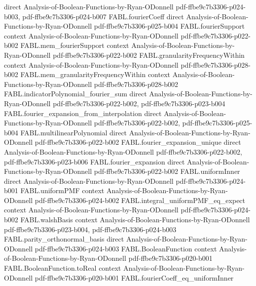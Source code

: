 \begin{theorem}
  {direct}
  {Analysis-of-Boolean-Functions-by-Ryan-ODonnell}
  {pdf-ffbe9c7b3306-p024-b003,
    pdf-ffbe9c7b3306-p024-b007}
\proofstep
  {FABL.fourierCoeff}
  {direct}
  {Analysis-of-Boolean-Functions-by-Ryan-ODonnell}
  {pdf-ffbe9c7b3306-p025-b004}
\proofstep
  {FABL.fourierSupport}
  {context}
  {Analysis-of-Boolean-Functions-by-Ryan-ODonnell}
  {pdf-ffbe9c7b3306-p022-b002}
\proofstep
  {FABL.mem_fourierSupport}
  {context}
  {Analysis-of-Boolean-Functions-by-Ryan-ODonnell}
  {pdf-ffbe9c7b3306-p022-b002}
\proofstep
  {FABL.granularityFrequencyWithin}
  {context}
  {Analysis-of-Boolean-Functions-by-Ryan-ODonnell}
  {pdf-ffbe9c7b3306-p028-b002}
\proofstep
  {FABL.mem_granularityFrequencyWithin}
  {context}
  {Analysis-of-Boolean-Functions-by-Ryan-ODonnell}
  {pdf-ffbe9c7b3306-p028-b002}
\proofstep
  {FABL.indicatorPolynomial_fourier_sum}
  {direct}
  {Analysis-of-Boolean-Functions-by-Ryan-ODonnell}
  {pdf-ffbe9c7b3306-p022-b002,
    pdf-ffbe9c7b3306-p023-b004}
\proofstep
  {FABL.fourier_expansion_from_interpolation}
  {direct}
  {Analysis-of-Boolean-Functions-by-Ryan-ODonnell}
  {pdf-ffbe9c7b3306-p022-b002,
    pdf-ffbe9c7b3306-p025-b004}
\proofstep
  {FABL.multilinearPolynomial}
  {direct}
  {Analysis-of-Boolean-Functions-by-Ryan-ODonnell}
  {pdf-ffbe9c7b3306-p022-b002}
\proofstep
  {FABL.fourier_expansion_unique}
  {direct}
  {Analysis-of-Boolean-Functions-by-Ryan-ODonnell}
  {pdf-ffbe9c7b3306-p022-b002,
    pdf-ffbe9c7b3306-p023-b006}
\proofstep
  {FABL.fourier_expansion}
  {direct}
  {Analysis-of-Boolean-Functions-by-Ryan-ODonnell}
  {pdf-ffbe9c7b3306-p022-b002}
\proofstep
  {FABL.uniformInner}
  {direct}
  {Analysis-of-Boolean-Functions-by-Ryan-ODonnell}
  {pdf-ffbe9c7b3306-p024-b001}
\proofstep
  {FABL.uniformPMF}
  {context}
  {Analysis-of-Boolean-Functions-by-Ryan-ODonnell}
  {pdf-ffbe9c7b3306-p024-b002}
\proofstep
  {FABL.integral_uniformPMF_eq_expect}
  {context}
  {Analysis-of-Boolean-Functions-by-Ryan-ODonnell}
  {pdf-ffbe9c7b3306-p024-b002}
\proofstep
  {FABL.walshBasis}
  {context}
  {Analysis-of-Boolean-Functions-by-Ryan-ODonnell}
  {pdf-ffbe9c7b3306-p023-b004,
    pdf-ffbe9c7b3306-p024-b003}
\proofstep
  {FABL.parity_orthonormal_basis}
  {direct}
  {Analysis-of-Boolean-Functions-by-Ryan-ODonnell}
  {pdf-ffbe9c7b3306-p024-b003}
\proofstep
  {FABL.BooleanFunction}
  {context}
  {Analysis-of-Boolean-Functions-by-Ryan-ODonnell}
  {pdf-ffbe9c7b3306-p020-b001}
\proofstep
  {FABL.BooleanFunction.toReal}
  {context}
  {Analysis-of-Boolean-Functions-by-Ryan-ODonnell}
  {pdf-ffbe9c7b3306-p020-b001}
\proofstep
  {FABL.fourierCoeff_eq_uniformInner}

\end{theorem}
